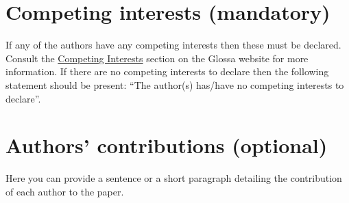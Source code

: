 \documentclass[charis,linguex,biblatex]{glossa}
\begin{document}
\section*{Competing interests (mandatory)}

If any of the authors have any competing interests then these must be declared. Consult the \href{http://www.glossa-journal.org/about/competinginterests/}{Competing Interests} section on the Glossa website for more information. If there are no competing interests to declare then the following statement should be present: ``The author(s) has/have no competing interests to declare''.

\section*{Authors' contributions (optional)}\label{contrib}

Here you can provide a sentence or a short paragraph detailing the contribution of each author to the paper.

\nocite{*} %

\printbibliography %
\end{document}
